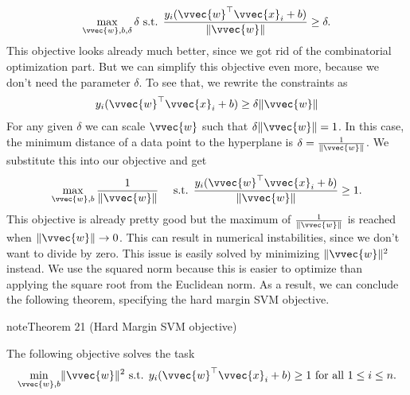 \documentclass[letterpaper,10pt,english]{jupyterBook}
\begin{document}
\begin{align*}
\max_{\vvec{w},b,\delta}\delta \text{ s.t. } \frac{y_i(\vvec{w}^\top\vvec{x}_i+b)}{\lVert \vvec{w}\rVert}\geq \delta.
\end{align*}
\sphinxAtStartPar
This objective looks already much better, since we got rid of the combinatorial optimization part. But we can simplify this objective even more, because we don’t need the parameter \(\delta\). To see that, we rewrite the constraints as
\begin{equation*}
\begin{split}
y_i(\vvec{w}^\top\vvec{x}_i+b)\geq \delta \lVert \vvec{w}\rVert
\end{split}
\end{equation*}
For any given \(\delta\) we can scale \(\vvec{w}\) such that \(\delta \lVert \vvec{w}\rVert=1\). In this case, the minimum distance of a data point to the hyperplane is \(\delta = \frac{1}{\lVert\vvec{w}\rVert}\). We substitute this into our objective and get
\begin{align*}
\max_{\vvec{w},b}\frac{1}{\lVert\vvec{w}\rVert} \quad\text{ s.t. } \frac{y_i(\vvec{w}^\top\vvec{x}_i+b)}{\lVert \vvec{w}\rVert}\geq 1.
\end{align*}
\sphinxAtStartPar
This objective is already pretty good but the maximum of \(\frac{1}{\lVert\vvec{w}\rVert}\) is reached when \(\lVert\vvec{w}\rVert\rightarrow 0\). This can result in numerical instabilities, since we don’t want to divide by zero. This issue is easily solved by minimizing \(\lVert\vvec{w}\rVert^2\) instead. We use the squared norm because this is easier to optimize than applying the square root from the Euclidean norm. As a result, we can conclude the following theorem, specifying the hard margin SVM objective.
\label{classification_svms:theorem-2}
\begin{sphinxadmonition}{note}{Theorem 21 (Hard Margin SVM objective)}



\sphinxAtStartPar
The following objective solves the {\hyperref[\detokenize{classification_svms:hard-margin-svm-task}]{}} task
\begin{equation*}
\begin{split}\min_{\vvec{w},b}\lVert \vvec{w}\rVert^2\text{ s.t. } y_i(\vvec{w}^\top\vvec{x}_i+b)\geq 1 \text{ for all }1\leq i\leq n.\end{split}
\end{equation*}
\end{sphinxadmonition}
\end{document}
